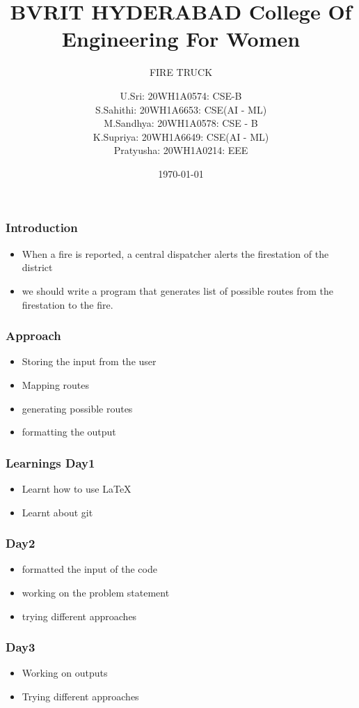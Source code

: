 \documentclass{beamer}
\title{BVRIT HYDERABAD College Of Engineering For Women}
\subtitle{FIRE TRUCK}
\date{\today}
\author[Bvrith]{U.Sri: 20WH1A0574: CSE-B \\ S.Sahithi: 20WH1A6653: CSE(AI - ML) \\ M.Sandhya: 20WH1A0578: CSE - B \\ K.Supriya: 20WH1A6649: CSE(AI - ML) \\ Pratyusha: 20WH1A0214: EEE}
\begin{document}
    \begin{frame}
        \titlepage
    \end{frame}
    \begin{frame}
	\frametitle{Introduction}
        \begin{itemize}
	    \item When a fire is reported, a central dispatcher alerts the firestation of the district
	    \item we should write a program that generates list of possible routes from the firestation to the fire.
	 
	\end{itemize}
    \end{frame}
    \begin{frame}
	\frametitle{Approach}
	\begin{itemize}
	    \item Storing the input from the user 
	    \item Mapping routes
	    \item generating possible routes
	    \item formatting the output
	\end{itemize}
    \end{frame}
    \begin{frame}
        \frametitle{Learnings Day1}
	\begin{itemize}
	    \item Learnt how to use LaTeX
	    \item Learnt about git
	    
	\end{itemize}
    \end{frame}
     \begin{frame}
    \frametitle{Day2}
      \begin{itemize}
          \item formatted the input of the code
          \item working on the problem statement
          \item trying different approaches 
      \end{itemize}
    \end{frame}
	    \begin{frame}
        \frametitle{Day3}
      \begin{itemize}
          \item Working on outputs
          \item Trying different approaches 
      \end{itemize}
    \end{frame}
\end{document}
